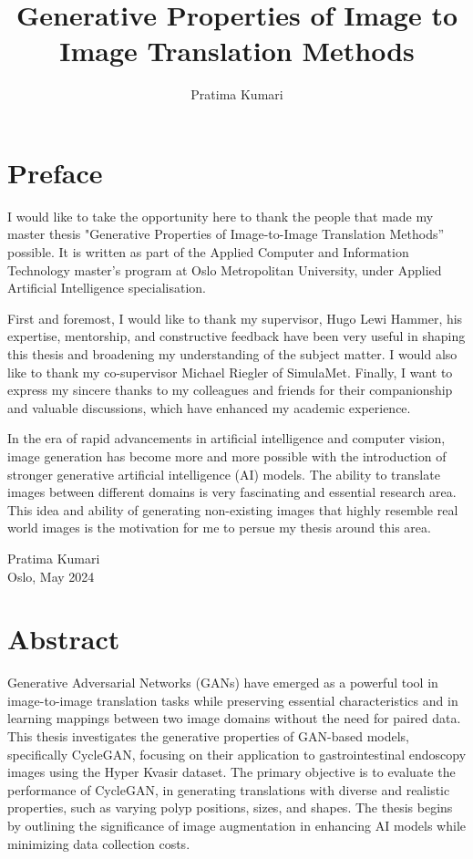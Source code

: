 \documentclass[UKenglish,12pt]{master-style}
\title{Generative Properties of Image to Image Translation Methods}
\author{Pratima Kumari}
\begin{document}
\duoforside[%
    dept={Department of Computer Science},  
    program={Applied Computer and Information Technology (ACIT)},
    short%
    ]

\frontmatter 

\chapter*{Preface}

I would like to take the opportunity here to thank the people that made my master thesis "Generative Properties of Image-to-Image Translation Methods” possible. It is written as part of the Applied Computer and Information Technology master’s program at Oslo Metropolitan University, under Applied Artificial Intelligence specialisation.  

First and foremost, I would like to thank my supervisor, Hugo Lewi Hammer, his expertise, mentorship, and constructive feedback have been very useful in shaping this thesis and broadening my understanding of the subject matter. I would also like to thank my co-supervisor Michael Riegler of SimulaMet. Finally, I want to express my sincere thanks to my colleagues and friends for their companionship and valuable discussions, which have enhanced my academic experience.

In the era of rapid advancements in artificial intelligence and computer vision, image generation has become more and more possible with the introduction of stronger generative artificial intelligence (AI) models. The ability to translate images between different domains is very fascinating and essential research area. This idea and ability of generating non-existing images that highly resemble real world images is the motivation for me to persue my thesis around this area.

Pratima Kumari\\
Oslo, May 2024 


\chapter*{Abstract}

Generative Adversarial Networks (GANs) have emerged as a powerful tool in image-to-image translation tasks  while preserving essential characteristics and in learning mappings between two image domains without the need for paired data. This thesis investigates the generative properties of GAN-based models, specifically CycleGAN, focusing on their application to gastrointestinal endoscopy images using the Hyper Kvasir dataset. The primary objective is to evaluate the performance of CycleGAN, in generating translations with diverse and realistic properties, such as varying polyp positions, sizes, and shapes. The thesis begins by outlining the significance of image augmentation in enhancing AI models while minimizing data collection costs. 
\end{document}
